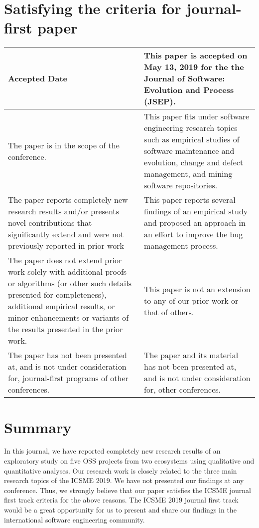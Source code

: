 \documentclass[conference]{IEEEtran}
\begin{document}
\section{Satisfying the criteria for journal-first paper}
\begin{table}[h]
\label{table:statBR}
\begin{center}
\begin{tabular}{ |p{3.9cm}|p{3.9cm}|}
\hline
Accepted Date& This paper is accepted on May 13, 2019 for the the Journal of Software: Evolution and Process (JSEP).\\ \hline
The paper is in the scope of the
conference.& This paper fits under software engineering research topics such as empirical studies of software maintenance and evolution, change and defect management, and mining software repositories.\\ \hline
The paper reports completely new research results and/or presents
novel contributions that significantly extend and were not previously
reported in prior work & This paper reports several findings of an empirical study and proposed an approach in an effort to improve the bug management process.\\ \hline
The paper does not extend prior work solely with additional proofs or algorithms (or other such details presented for completeness), additional
empirical results, or minor enhancements or variants of the results presented in the prior work.& This paper is not an extension to any of our prior work or that of others. \\ \hline
The paper has not been presented at, and is not under consideration
for, journal-first programs of other conferences.& The paper and its material has not been presented at, and is not under consideration for, other conferences. \\ \hline
\end{tabular}
\end{center}
\end{table} 
\section{Summary}
In this journal, we have reported completely new research results of an exploratory study on five OSS projects from two ecosystems using qualitative and quantitative analyses. Our research work is closely related to the three main research topics of the ICSME 2019. We have not presented our findings at any conference. Thus, we strongly believe that our paper satisfies the ICSME journal first track criteria for the above reasons. The ICSME 2019 journal first track would be a great opportunity for us to present and share our findings in the international software engineering community.


\end{document}
